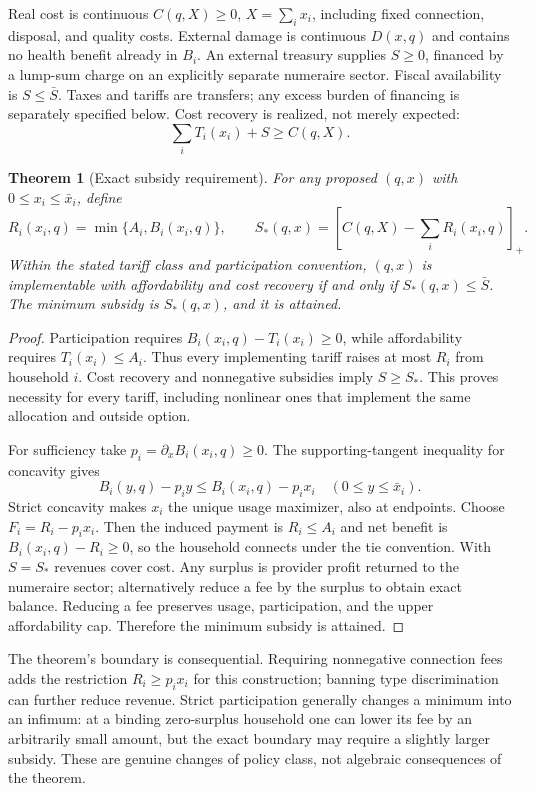 \documentclass[11pt]{article}
\newtheorem{theorem}{Theorem}
\theoremstyle{remark}
\begin{document}
Real cost is continuous $C(q,X)\geq0$, $X=\sum_ix_i$, including fixed connection, disposal, and quality costs. External damage is continuous $D(x,q)$ and contains no health benefit already in $B_i$. An external treasury supplies $S\geq0$, financed by a lump-sum charge on an explicitly separate numeraire sector. Fiscal availability is $S\leq\bar S$. Taxes and tariffs are transfers; any excess burden of financing is separately specified below. Cost recovery is realized, not merely expected:
\[
 \sum_iT_i(x_i)+S\geq C(q,X).
\]

\begin{theorem}[Exact subsidy requirement]\label{subsidy}
For any proposed $(q,x)$ with $0\leq x_i\leq\bar x_i$, define
\[
 R_i(x_i,q)=\min\{A_i,B_i(x_i,q)\},\qquad
 S_*(q,x)=\left[C(q,X)-\sum_iR_i(x_i,q)\right]_+.
\]
Within the stated tariff class and participation convention, $(q,x)$ is implementable with affordability and cost recovery if and only if $S_*(q,x)\leq\bar S$. The minimum subsidy is $S_*(q,x)$, and it is attained.
\end{theorem}
\begin{proof}
Participation requires $B_i(x_i,q)-T_i(x_i)\geq0$, while affordability requires $T_i(x_i)\leq A_i$. Thus every implementing tariff raises at most $R_i$ from household $i$. Cost recovery and nonnegative subsidies imply $S\geq S_*$. This proves necessity for every tariff, including nonlinear ones that implement the same allocation and outside option.

For sufficiency take $p_i=\partial_xB_i(x_i,q)\geq0$. The supporting-tangent inequality for concavity gives
\[
 B_i(y,q)-p_i y\leq B_i(x_i,q)-p_i x_i
 \quad(0\leq y\leq\bar x_i).
\]
Strict concavity makes $x_i$ the unique usage maximizer, also at endpoints. Choose $F_i=R_i-p_ix_i$. Then the induced payment is $R_i\leq A_i$ and net benefit is $B_i(x_i,q)-R_i\geq0$, so the household connects under the tie convention. With $S=S_*$ revenues cover cost. Any surplus is provider profit returned to the numeraire sector; alternatively reduce a fee by the surplus to obtain exact balance. Reducing a fee preserves usage, participation, and the upper affordability cap. Therefore the minimum subsidy is attained.
\end{proof}

The theorem's boundary is consequential. Requiring nonnegative connection fees adds the restriction $R_i\geq p_ix_i$ for this construction; banning type discrimination can further reduce revenue. Strict participation generally changes a minimum into an infimum: at a binding zero-surplus household one can lower its fee by an arbitrarily small amount, but the exact boundary may require a slightly larger subsidy. These are genuine changes of policy class, not algebraic consequences of the theorem.
\end{document}
